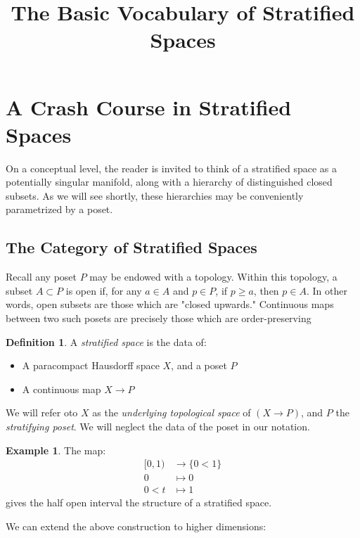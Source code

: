 \documentclass[11pt,reqno]{amsart}
\title{The Basic Vocabulary of Stratified Spaces}
\theoremstyle{plain}
\numberwithin{equation}{section}
\theoremstyle{remark}
\theoremstyle{definition}
\newtheorem{defi}[thm]{Definition}
\newtheorem{ex}[thm]{Example}
\begin{document}
\maketitle



\section{A Crash Course in Stratified Spaces}

On a conceptual level, the reader is invited to think of a stratified space as a potentially singular manifold, along with a hierarchy of distinguished closed subsets. As we will see shortly, these hierarchies may be conveniently parametrized by a poset. 

\subsection{The Category of Stratified Spaces}


Recall any poset $P$ may be endowed with a topology. Within this topology, a subset $A\subset P$ is open if, for any $a \in A$ and $p \in P$,  if $p \geq a$, then $p \in A$. In other words, open subsets are those which are "closed upwards." Continuous maps between two such posets are precisely those which are order-preserving

\begin{defi}
A \textit{stratified space} is the data of:
\begin{itemize}
\item A paracompact Hausdorff space $X$, and a poset $P$
\item A continuous map $X \rightarrow P$
\end{itemize}
We will refer oto $X$ as the \textit{underlying topological space} of $(X \rightarrow P)$, and $P$ the \textit{stratifying poset}. We will neglect the data of the poset in our notation. 
\end{defi}

\begin{ex}
The map:
\begin{align*}
[0, 1) &\rightarrow \{0 < 1\} \\
0 &\longmapsto 0 \\
0< t &\longmapsto 1
\end{align*}
gives the half open interval the structure of a stratified space. 
\end{ex}
We can extend the above construction to higher dimensions:
\end{document}
